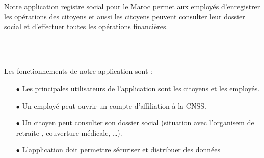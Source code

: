 Notre application registre social pour le Maroc permet aux employés  d'enregistrer les opérations  des citoyens et aussi les citoyens peuvent consulter leur dossier social et  d’effectuer toutes les opérations
financières. \\\\\\
\subsection*{}
Les fonctionnements de notre application sont :\vspace*{0.5cm}
\begin{itemize}
  \item[$\bullet$] Les principales utilisateurs de l'application sont les citoyens et les employés.\\
  
   \item[$\bullet$] Un employé peut ouvrir un compte d'affiliation à la CNSS.\\
  \item[$\bullet$] Un citoyen peut consulter son dossier social (situation  avec l’organisem de retraite , couverture médicale, …).\\
  \item[$\bullet$] L'application doit permettre sécuriser et distribuer des données\\



\end{itemize}
